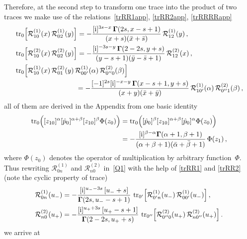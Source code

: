 \documentclass[a4paper,11pt]{article}
\renewcommand{\imath}{\mathrm{i}}
\newcommand{\tr}{\mathop{\rm tr}\nolimits}
\numberwithin{equation}{section}
\begin{document}
Therefore, at the second step to transform one trace into the product of two traces we make use of the relations~\eqref{trRR1app}, \eqref{trRR2app}, \eqref{trRRRRapp}
\begin{align}
	& \label{trRR1}
	\tr_0\Bigl[\mathcal{R}^{(1)}_{10}(x)\,\mathcal{R}^{(1)}_{02}(y)\Bigr] = -\frac{[\imath]^{3s-x}\,\mathbf{\Gamma}(2s, x-s+1)}{(x+s)(\bar{x}+\bar{s})} \, \mathcal{R}^{(1)}_{12}(y) \,, \\
	& \label{trRR2}
	\tr_0\Bigl[\mathcal{R}^{(2)}_{10}(x)\,\mathcal{R}^{(2)}_{02}(y)\Bigr] = -\frac{[\imath]^{-3s-y}\,\mathbf{\Gamma}(2-2s, y+s)}{(y-s+1)(\bar{y}-\bar{s}+1)} \, \mathcal{R}^{(2)}_{12}(x) \,, \\
	& \nonumber
	\tr_0\Bigl[\mathcal{R}^{(1)}_{10}(x)\,\mathcal{R}^{(2)}_{01}(y)\,\mathcal{R}^{(1)}_{00'}(\alpha)\,\mathcal{R}^{(2)}_{0''0}(\beta)\Bigr] \\
	& \label{trRRRR}
	\qquad\qquad\qquad\qquad\;\;\;
	= -\frac{[-1]^{2s} [\imath]^{-x-y}\,\mathbf{\Gamma}(x-s+1, y+s)}{(x+y)(\bar{x}+\bar{y})}
	\,\mathcal{R}^{(1)}_{10'}(\alpha)\,\mathcal{R}^{(2)}_{0''1}(\beta) \,,
\end{align}
all of them are derived in the Appendix from one basic identity
\begin{align*}
	\tr_0\Bigl([z_{10}]^\alpha[\hat{p}_0]^{\alpha+\beta}[z_{10}]^\beta
	\Phi(z_0)\Bigr) & =
	\tr_0\Bigl([\hat{p}_0]^{\beta} [z_{10}]^{\alpha+\beta} [\hat{p}_0]^{\alpha}
	\Phi(z_0)\Bigr) \\
	& = -\frac{[\imath]^{\beta-\alpha} \mathbf{\Gamma}(\alpha+1,\beta+1)}{(\alpha+\beta+1)(\bar{\alpha}+\bar{\beta}+1)} \, \Phi(z_1) \,,
\end{align*}
where $\Phi(z_0)$ denotes the operator of multiplication by arbitrary function~$\Phi$.
Thus rewriting $\mathcal{R}^{(1)}_{0n}$ and $\mathcal{R}^{(2)}_{n0}$ in~\eqref{Q1} with the help of \eqref{trRR1} and \eqref{trRR2} (note the cyclic property of trace)
\begin{align}
	& \nonumber
	\mathcal{R}^{(1)}_{0n}(u_-) = -\frac{[\imath]^{u_--3s}\,[u_-+s]}{\mathbf{\Gamma}(2s, u_--s+1)} \, 
	\tr_{0'}\Bigl[\mathcal{R}^{(1)}_{0'n}(u_-)\,\mathcal{R}^{(1)}_{00'}(u_-)\Bigr] \,, \\
	& \label{RtrRR}
	\mathcal{R}^{(2)}_{n0}(u_+) = -\frac{[\imath]^{u_++3s}\,[u_+-s+1]}{\mathbf{\Gamma}(2-2s,u_++s)} \,
	\tr_{0''}\Bigl[\mathcal{R}^{(2)}_{0''0}(u_+)\,\mathcal{R}^{(2)}_{n0''}(u_+)\Bigr] \,.
\end{align}
we arrive at
\end{document}
